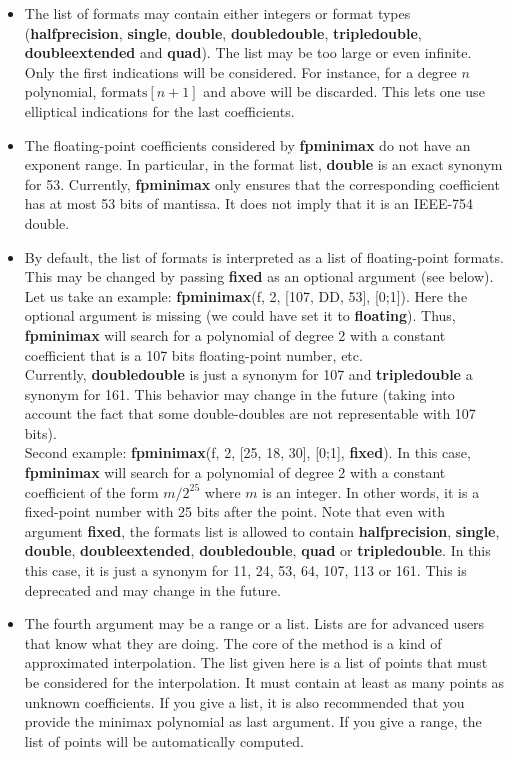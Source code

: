 \begin{itemize}
\item The list of formats may contain either integers or format types
   (\textbf{halfprecision}, \textbf{single}, \textbf{double}, \textbf{doubledouble}, \textbf{tripledouble}, \textbf{doubleextended}
   and \textbf{quad}). The list may be too large or even infinite. Only the first
   indications will be considered. For instance, for a degree $n$ polynomial,
   $\mathrm{formats}[n+1]$ and above will be discarded. This lets one use elliptical
   indications for the last coefficients.

\item The floating-point coefficients considered by \textbf{fpminimax} do not have an
   exponent range. In particular, in the format list, \textbf{double} is an exact synonym
   for 53. Currently, \textbf{fpminimax} only ensures that the corresponding coefficient
   has at most 53 bits of mantissa. It does not imply that it is an
   IEEE-754 double.

\item By default, the list of formats is interpreted as a list of floating-point
   formats. This may be changed by passing \textbf{fixed} as an optional argument (see
   below). Let us take an example: \textbf{fpminimax}(f, 2, [107, DD, 53], [0;1]).
   Here the optional argument is missing (we could have set it to \textbf{floating}).
   Thus, \textbf{fpminimax} will search for a polynomial of degree 2 with a constant
   coefficient that is a 107 bits floating-point number, etc.\\
   Currently, \textbf{doubledouble} is just a synonym for 107 and \textbf{tripledouble} a
   synonym for 161. This behavior may change in the future (taking into
   account the fact that some double-doubles are not representable with
   107 bits).\\
   Second example: \textbf{fpminimax}(f, 2, [25, 18, 30], [0;1], \textbf{fixed}).
   In this case, \textbf{fpminimax} will search for a polynomial of degree 2 with a
   constant coefficient of the form $m/2^{25}$ where $m$ is an
   integer. In other words, it is a fixed-point number with 25 bits after
   the point. Note that even with argument \textbf{fixed}, the formats list is
   allowed to contain \textbf{halfprecision}, \textbf{single}, \textbf{double}, \textbf{doubleextended},
   \textbf{doubledouble}, \textbf{quad} or \textbf{tripledouble}. In this this case, it is just
   a synonym for 11, 24, 53, 64, 107, 113 or 161. This is deprecated and
   may change in the future.

\item The fourth argument may be a range or a list. Lists are for advanced users
   that know what they are doing. The core of the  method is a kind of
   approximated interpolation. The list given here is a list of points that
   must be considered for the interpolation. It must contain at least as
   many points as unknown coefficients. If you give a list, it is also
   recommended that you provide the minimax polynomial as last argument.
   If you give a range, the list of points will be automatically computed.


\end{itemize}
